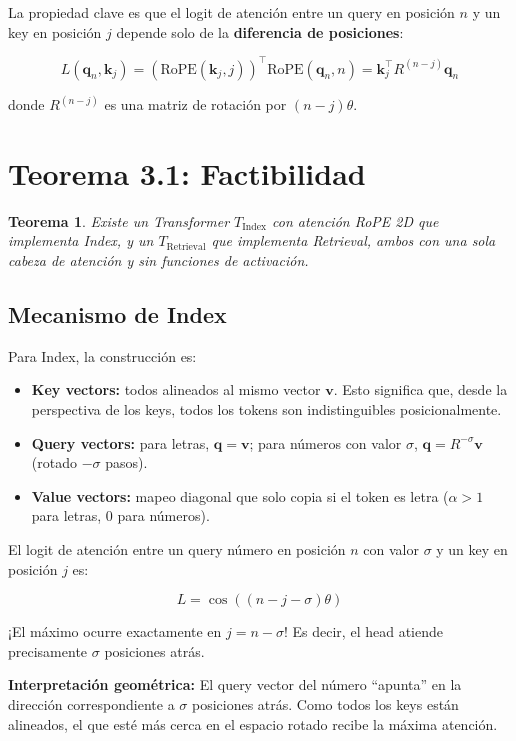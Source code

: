 \documentclass[12pt,a4paper,oneside]{report}
\newtheorem{theorem}{Teorema}[chapter]
\begin{document}
La propiedad clave es que el logit de atención entre un query en posición $n$ y un key en posición $j$ depende solo de la \textbf{diferencia de posiciones}:

\[
L(\mathbf{q}_n, \mathbf{k}_j) = (\text{RoPE}(\mathbf{k}_j, j))^\top \text{RoPE}(\mathbf{q}_n, n) = \mathbf{k}_j^\top R^{(n-j)}\mathbf{q}_n
\]

donde $R^{(n-j)}$ es una matriz de rotación por $(n-j)\theta$.

\section{Teorema 3.1: Factibilidad}

\begin{theorem}
Existe un Transformer $T_{\text{Index}}$ con atención RoPE 2D que implementa Index, y un $T_{\text{Retrieval}}$ que implementa Retrieval, ambos con una sola cabeza de atención y sin funciones de activación.
\end{theorem}

\subsection{Mecanismo de Index}

Para Index, la construcción es:

\begin{itemize}
    \item \textbf{Key vectors:} todos alineados al mismo vector $\mathbf{v}$. Esto significa que, desde la perspectiva de los keys, todos los tokens son indistinguibles posicionalmente.
    \item \textbf{Query vectors:} para letras, $\mathbf{q} = \mathbf{v}$; para números con valor $\sigma$, $\mathbf{q} = R^{-\sigma}\mathbf{v}$ (rotado $-\sigma$ pasos).
    \item \textbf{Value vectors:} mapeo diagonal que solo copia si el token es letra ($\alpha > 1$ para letras, 0 para números).
\end{itemize}

El logit de atención entre un query número en posición $n$ con valor $\sigma$ y un key en posición $j$ es:

\[
L = \cos((n - j - \sigma)\theta)
\]

¡El máximo ocurre exactamente en $j = n - \sigma$! Es decir, el head atiende precisamente $\sigma$ posiciones atrás.

\textbf{Interpretación geométrica:} El query vector del número ``apunta'' en la dirección correspondiente a $\sigma$ posiciones atrás. Como todos los keys están alineados, el que esté más cerca en el espacio rotado recibe la máxima atención.
\end{document}

